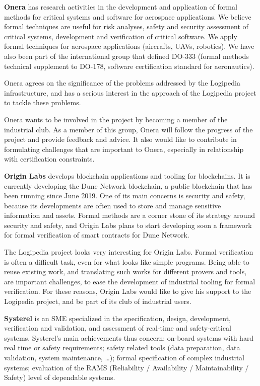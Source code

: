 {\bf Onera} has research activities in the development and application
of formal methods for critical systems and software for aerospace
applications. We believe formal techniques are useful for risk
analyses, safety and security assessment of critical systems,
development and verification of critical software. We apply formal
techniques for aerospace applications (aircrafts, UAVs, robotics). We
have also been part of the international group that defined DO-333
(formal methods technical supplement to DO-178, software certification
standard for aeronautics).

Onera agrees on the significance of the problems addressed by the
Logipedia infrastructure, and has a serious interest in the approach
of the Logipedia project to tackle these problems.

Onera wants to be involved in the project by becoming a member of the
industrial club. As a member of this group, Onera will follow the
progress of the project and provide feedback and advice. It also would
like to contribute in formulating challenges that are important to
Onera, especially in relationship with certification constraints.

{\bf Origin Labs} develops blockchain applications and tooling for
blockchains. It is currently developing the Dune Network blockchain, a
public blockchain that has been running since June 2019. One of its
main concerns is security and safety, because its developments are
often used to store and manage sensitive information and
assets. Formal methods are a corner stone of its strategy around
security and safety, and Origin Labs plans to start developing soon a
framework for formal verification of smart contracts for Dune Network.

The Logipedia project looks very interesting for Origin Labs. Formal
verification is often a difficult task, even for what looks like
simple programs. Being able to reuse existing work, and translating
such works for different provers and tools, are important challenges,
to ease the development of industrial tooling for formal
verification. For these reasons, Origin Labs would like to give his
support to the Logipedia project, and be part of its club of
industrial users.

{\bf Systerel} is an SME specialized in the specification, design,
development, verification and validation, and assessment of real-time
and safety-critical systems. Systerel's main achievements thus
concern: on-board systems with hard real time or safety requirements;
safety related tools (data preparation, data validation, system
maintenance, \ldots); formal specification of complex industrial
systems; evaluation of the RAMS (Reliability / Availability /
Maintainability / Safety) level of dependable systems.

